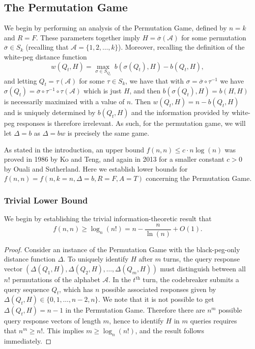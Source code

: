 \documentclass[12pt, a4paper]{article}
\newcommand{\inv}{^{-1}}              %
\newcommand{\nth}{^{\text{th}}}       %
\begin{document}
\subsection{The Permutation Game}
We begin by performing an analysis of the Permutation Game, defined by $n=k$ and $R=F$. These parameters together imply $H=\overline{\sigma}(\mathcal{A})$ for some permutation $\overline{\sigma}\in S_k$ (recalling that $\mathcal{A}=\{1,2,\ldots, k\}$). Moreover, recalling the definition of the white-peg distance function
\begin{equation*}
	w(Q_t, H) = \max_{\sigma\in S_{Q_t}}~b(\sigma(Q_t), H) - b(Q_t, H),
\end{equation*}
and letting $Q_t = \tau(\mathcal{A})$ for some $\tau \in S_k$, we have that with $\sigma = \overline{\sigma}\circ \tau\inv$ we have $\sigma(Q_t) = \overline{\sigma}\circ\tau\inv\circ\tau(\mathcal A)$ which is just $H$, and then $b(\sigma(Q_t),H) = b(H,H)$  is necessarily maximized with a value of $n$. Then $w(Q_t,H) = n - b(Q_t,H)$ and is uniquely determined by $b(Q_t,H)$ and the information provided by white-peg responses is therefore irrelevant. As such, for the permutation game, we will let $\Delta = b$ as $\Delta = bw$ is precisely the same game.

 As stated in the introduction, an upper bound $f(n, n)\le c\cdot n\log(n)$ was proved in 1986 by Ko and Teng, and again in 2013 for a smaller constant $c>0$ by Ouali and Sutherland. Here we establish lower bounds for $f(n, n) = f(n, k=n, \Delta=b, R=F, A=T)$ concerning the Permutation Game.

	\subsubsection{Trivial Lower Bound}
	We begin by establishing the trivial information-theoretic result that
	\begin{equation*}
		f(n, n)\ge \log_{n}(n!) = n-\frac{n}{\ln(n)}+O(1).
	\end{equation*}
	\begin{proof}
		Consider an instance of the Permutation Game with the black-peg-only distance function $\Delta$. To uniquely identify $H$ after $m$ turns, the query response vector $(\Delta(Q_1, H), \Delta(Q_2, H), \ldots, \Delta(Q_m, H))$ must distinguish between all $n!$ permutations of the alphabet $\mathcal{A}$. In the $t\nth$ turn, the codebreaker submits a query sequence $Q_t$, which has $n$ possible associated responses given by $\Delta(Q_t, H)\in\{0, 1, \ldots, n-2, n\}$. We note that it is not possible to get $\Delta(Q_t, H)=n-1$ in the Permutation Game. Therefore there are $n^m$ possible query response vectors of length $m$, hence to identify $H$ in $m$ queries requires that $n^m\ge n!$. This implies $m\ge\log_n(n!)$, and the result follows immediately.
	\end{proof}
\end{document}
